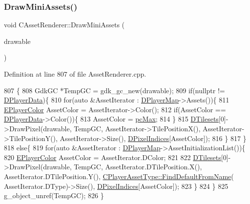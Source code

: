 \subsubsection{\texorpdfstring{Draw\+Mini\+Assets()}{DrawMiniAssets()}}
{\footnotesize\ttfamily void C\+Asset\+Renderer\+::\+Draw\+Mini\+Assets (\begin{DoxyParamCaption}\item[{Gdk\+Drawable $\ast$}]{drawable }\end{DoxyParamCaption})}



Definition at line 807 of file Asset\+Renderer.\+cpp.


\begin{DoxyCode}
807                                                         \{
808     GdkGC *TempGC = gdk\_gc\_new(drawable);
809     \textcolor{keywordflow}{if}(\textcolor{keyword}{nullptr} != \hyperlink{classCAssetRenderer_ae0f36013db2ef04b08b74d92249c1af5}{DPlayerData})\{
810         \textcolor{keywordflow}{for}(\textcolor{keyword}{auto} &AssetIterator : \hyperlink{classCAssetRenderer_a422a3f7e4202e73431fba7036e494dfe}{DPlayerMap}->Assets())\{
811             \hyperlink{GameDataTypes_8h_aafb0ca75933357ff28a6d7efbdd7602f}{EPlayerColor} AssetColor = AssetIterator->Color();
812             \textcolor{keywordflow}{if}(AssetColor == \hyperlink{classCAssetRenderer_ae0f36013db2ef04b08b74d92249c1af5}{DPlayerData}->Color())\{
813                 AssetColor = \hyperlink{GameDataTypes_8h_aafb0ca75933357ff28a6d7efbdd7602fa594a5c8dd3987f24e8a0f23f1a72cd34}{pcMax};
814             \}
815             \hyperlink{classCAssetRenderer_ae8201de704851c1de6424a8da77b785e}{DTilesets}[0]->DrawPixel(drawable, TempGC, AssetIterator->TilePositionX(), 
      AssetIterator->TilePositionY(), AssetIterator->Size(), \hyperlink{classCAssetRenderer_aa1d9cd6de6b897ec0b5a244bf822e6bd}{DPixelIndices}[AssetColor]);
816         \}
817     \}
818     \textcolor{keywordflow}{else}\{
819         \textcolor{keywordflow}{for}(\textcolor{keyword}{auto} &AssetIterator : \hyperlink{classCAssetRenderer_a422a3f7e4202e73431fba7036e494dfe}{DPlayerMap}->AssetInitializationList())\{
820             \hyperlink{GameDataTypes_8h_aafb0ca75933357ff28a6d7efbdd7602f}{EPlayerColor} AssetColor = AssetIterator.DColor;
821 
822             \hyperlink{classCAssetRenderer_ae8201de704851c1de6424a8da77b785e}{DTilesets}[0]->DrawPixel(drawable, TempGC, AssetIterator.DTilePosition.X(), 
      AssetIterator.DTilePosition.Y(), \hyperlink{classCPlayerAssetType_a7e1684eac4efaf7afe9a5c15af262b33}{CPlayerAssetType::FindDefaultFromName}(
      AssetIterator.DType)->Size(), \hyperlink{classCAssetRenderer_aa1d9cd6de6b897ec0b5a244bf822e6bd}{DPixelIndices}[AssetColor]);
823         \}
824     \}
825     g\_object\_unref(TempGC);
826 \}
\end{DoxyCode}
